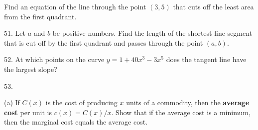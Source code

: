 \documentclass{sebase}
\begin{document}
\begin{multicols}{2}
\begin{ExerciseList}
%

\item[{\hfill {\protect\fbox{\hspace{-2pt}50.\hspace{-2pt}}}}] Find an
equation of the line through the point $(3,5)$ that cuts off the least area
from the first quadrant.

%

\item[\hfill 51.] Let $a$ and $b$ be positive numbers. Find the length of
the shortest line segment that is cut off by the first quadrant and passes
through the point $(a,b)$.

%

%

\item[\hfill 52.] At which points on the curve $y=1+40x^{3}-3x^{5}$ does the
tangent line have the largest slope?

%

\item[\hfill 53.] 

\begin{ExerciseList}
\item[(a)] If $C(x)$ is the cost of producing $x$ units of a commodity, then
the \textbf{average cost} per unit is $c(x)=C(x)/x$. Show that if the
average cost is a minimum, then the marginal cost equals the average cost.

%


\end{ExerciseList}
\end{ExerciseList}
\end{multicols}
\end{document}
